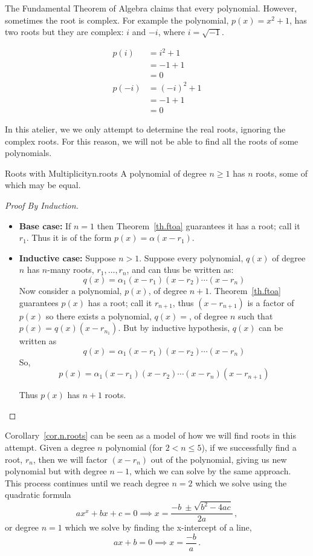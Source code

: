 The Fundamental Theorem of Algebra claims that every polynomial.  However, sometimes the root is complex.
For example the polynomial, $p(x) = x^2 + 1$, has two roots but they are complex: $i$ and $-i$, where $i=\sqrt{-1}$.

\begin{align*}
  p(i) &= i^2 + 1 \\
  &= -1 + 1 \\
  &= 0\\[3pt]
  p(-i) &= (-i)^2 + 1 \\
  &= -1 + 1 \\
  &= 0
\end{align*}

In this atelier, we we only attempt to determine the real roots, ignoring the complex roots.
For this reason, we will not be able to find all the roots of some polynomials.

\begin{corollary}{Roots with Multiplicity}{n.roots}
  A polynomial of degree $n\ge 1$ has $n$ roots, some of which may be equal.
\end{corollary}
\begin{proof}[Proof By Induction]
  
  \begin{itemize}
    
  \item \textbf{Base case:} If $n=1$ then Theorem~\ref{th.ftoa}
    guarantees it has a root; call it $r_1$.  Thus it is of the form
    $p(x)=\alpha (x-r_1)$.
  \item \textbf{Inductive case:} Suppose $n>1$.  Suppose every polynomial, $q(x)$ of degree
    $n$ has $n$-many roots, $r_1,\ldots,r_n$, and can thus be written as:
    \[q(x) = \alpha_1 (x - r_1) (x - r_2) \cdots (x - r_n)\]
    Now consider a polynomial, $p(x)$, of
    degree $n+1$.  Theorem~\ref{th.ftoa} guarantees $p(x)$ has a root;
    call it $r_{n+1}$, thus $(x-r_{n+1})$ is a factor of $p(x)$ so there
    exists a polynomial, $q(x)=$, of degree $n$ such that
    $p(x) =  q(x) (x-r_{n_1})$.
    But by inductive hypothesis, $q(x)$ can be written
    as \[q(x) = \alpha_1 (x - r_1) (x - r_2) \cdots (x - r_n)\]
    So, \[p(x) = \alpha_1 (x - r_1) (x - r_2) \cdots (x - r_n) (x-r_{n+1})\]

    Thus $p(x)$ has $n+1$ roots.

  \end{itemize}
\end{proof}

Corollary~\ref{cor.n.roots} can be seen as a model of how we will find
roots in this attempt.  Given a degree $n$ polynomial (for $2<n\leq
5$), if we successfully find a root, $r_n$, then we will factor
$(x-r_n)$ out of the polynomial, giving us new polynomial but with
degree $n-1$, which we can solve by the same approach.  This process
continues until we reach degree $n=2$ which we solve using the
quadratic formula
\[ a x^x + b x + c = 0 \implies x = \frac{-b~ \pm \sqrt{b^2 - 4a c}}{2a}\,,\] or
degree $n=1$ which we solve by finding the x-intercept of a line,
\[ a x + b = 0 \implies x=\frac{-b}{a}\,.\]
